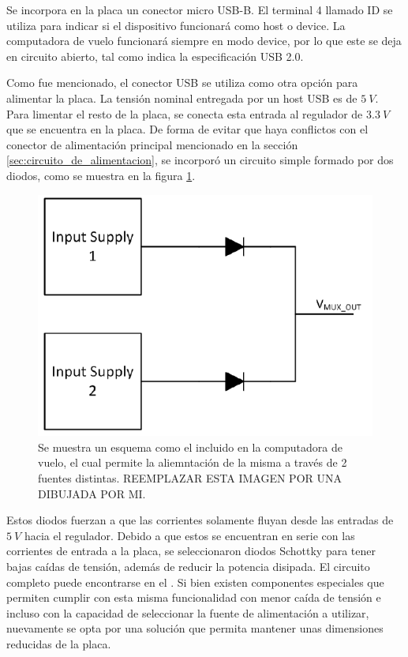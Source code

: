 Se incorpora en la placa un conector micro USB-B. El terminal 4 llamado ID se utiliza para indicar si el dispositivo funcionará como host o device. La computadora de vuelo funcionará siempre en modo device, por lo que este se deja en circuito abierto, tal como indica la especificación USB 2.0.


Como fue mencionado, el conector USB se utiliza como otra opción para alimentar la placa. La tensión nominal entregada por un host USB es de $5 \ V$. Para limentar el resto de la placa, se conecta esta entrada al regulador de $3.3 \ V$ que se encuentra en la placa. De forma de evitar que haya conflictos con el conector de alimentación principal mencionado en la sección \ref{sec:circuito_de_alimentacion}, se incorporó un circuito simple formado por dos diodos, como se muestra en la figura \ref{fig:diode_oring}.

\begin{figure}[H]
    \centering
    \includegraphics[width=0.4
    \textwidth]{img/diode_oring.png}
    \caption{Se muestra un esquema como el incluido en la computadora de vuelo, el cual permite la aliemntación de la misma a través de 2 fuentes distintas. {\color{red} REEMPLAZAR ESTA IMAGEN POR UNA DIBUJADA POR MI.}}
    \label{fig:diode_oring}    
\end{figure}

Estos diodos fuerzan a que las corrientes solamente fluyan desde las entradas de $5 \ V$ hacia el regulador. Debido a que estos se encuentran en serie con las corrientes de entrada a la placa, se seleccionaron diodos Schottky para tener bajas caídas de tensión, además de reducir la potencia disipada. El circuito completo puede encontrarse en el . Si bien existen componentes especiales que permiten cumplir con esta misma funcionalidad con menor caída de tensión e incluso con la capacidad de seleccionar la fuente de alimentación a utilizar, nuevamente se opta por una solución que permita mantener unas dimensiones reducidas de la placa.

